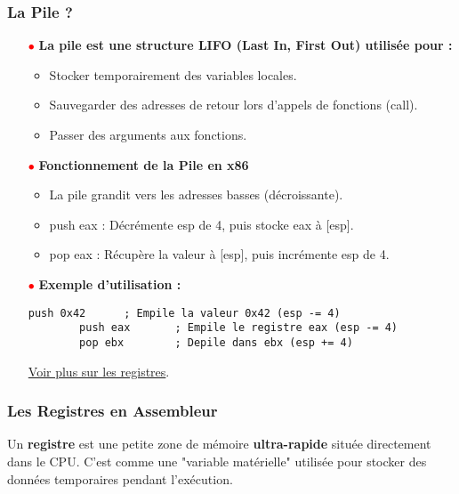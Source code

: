 \documentclass{article}
\begin{document}
\subsubsection*{La Pile ?}
\begin{figure}
    \label{fig:pilenasm}
\end{figure}
\begin{itemize}
    \item[\textbf{\textcolor{red}{$\bullet$}}] \textbf{La pile est une structure LIFO (Last In, First Out) utilisée pour :}
    \begin{itemize} 
    \item Stocker temporairement des variables locales.
    \item Sauvegarder des adresses de retour lors d’appels de fonctions (call).
    \item Passer des arguments aux fonctions.
    \end{itemize}
    
    \item[\textbf{\textcolor{red}{$\bullet$}}] \textbf{Fonctionnement de la Pile en x86}
    \begin{itemize} 
        \item     La pile grandit vers les adresses basses (décroissante).
        \item push eax : Décrémente esp de 4, puis stocke eax à [esp].
        \item pop eax : Récupère la valeur à [esp], puis incrémente esp de 4.
    \end{itemize}
    \item[\textbf{\textcolor{red}{$\bullet$}}] \textbf{Exemple d’utilisation :}
    \begin{lstlisting}[language=ld]
        push 0x42      ; Empile la valeur 0x42 (esp -= 4)
        push eax       ; Empile le registre eax (esp -= 4)
        pop ebx        ; Depile dans ebx (esp += 4)
    \end{lstlisting}
    \hyperref[fig:registres]{Voir plus sur les registres}.


\end{itemize}

\subsubsection*{Les Registres en Assembleur}
\begin{figure}
    \label{fig:registres}
\end{figure}
Un \textbf{registre} est une petite zone de mémoire \textbf{ultra-rapide} située directement dans le CPU. 
C'est comme une "variable matérielle" utilisée pour stocker des données temporaires pendant l'exécution.
\end{document}

